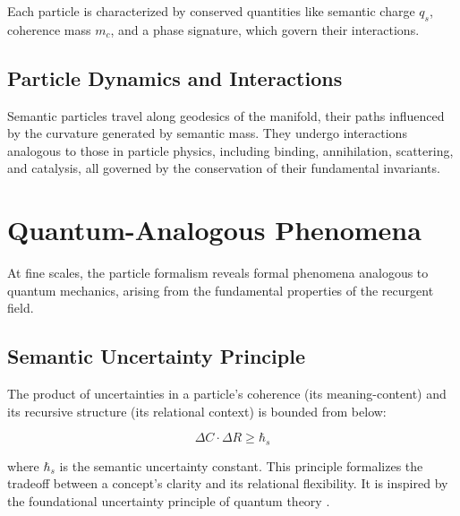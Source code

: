 Each particle is characterized by conserved quantities like semantic charge \(q_s\), coherence mass \(m_c\), and a phase signature, which govern their interactions.


\subsection{Particle Dynamics and Interactions}
\label{sec:particle_dynamics_and_interactions}

Semantic particles travel along geodesics of the manifold, their paths influenced by the curvature generated by semantic mass. They undergo interactions analogous to those in particle physics, including binding, annihilation, scattering, and catalysis, all governed by the conservation of their fundamental invariants.


\section{Quantum-Analogous Phenomena}
\label{sec:quantum_analogous_phenomena}

At fine scales, the particle formalism reveals formal phenomena analogous to quantum mechanics, arising from the fundamental properties of the recurgent field.


\subsection{Semantic Uncertainty Principle}
\label{sec:semantic_uncertainty_principle}

The product of uncertainties in a particle's coherence (its meaning-content) and its recursive structure (its relational context) is bounded from below:

\begin{equation}
\Delta C \cdot \Delta R \geq \hbar_s
\end{equation}

where \(\hbar_s\) is the semantic uncertainty constant. This principle formalizes the tradeoff between a concept's clarity and its relational flexibility. It is inspired by the foundational uncertainty principle of quantum theory \autocite{Heisenberg1927, WheelerZurek1983}.

